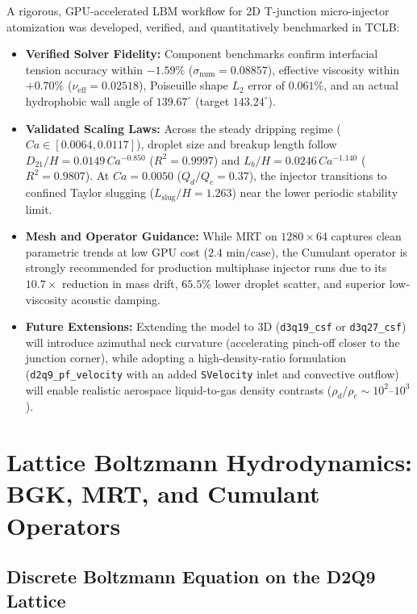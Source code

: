 \documentclass[11pt,a4paper]{article}
\begin{document}
A rigorous, GPU-accelerated LBM workflow for 2D T-junction micro-injector atomization was developed, verified, and quantitatively benchmarked in TCLB:
\begin{itemize}
    \item \textbf{Verified Solver Fidelity:} Component benchmarks confirm interfacial tension accuracy within $-1.59\%$ ($\sigma_{\mathrm{num}} = 0.08857$), effective viscosity within $+0.70\%$ ($\nu_{\mathrm{eff}} = 0.02518$), Poiseuille shape $L_2$ error of $0.061\%$, and an actual hydrophobic wall angle of $139.67^\circ$ (target $143.24^\circ$).
    \item \textbf{Validated Scaling Laws:} Across the steady dripping regime ($Ca \in [0.0064, 0.0117]$), droplet size and breakup length follow $D_{21}/H = 0.0149\,Ca^{-0.850}$ ($R^2 = 0.9997$) and $L_b/H = 0.0246\,Ca^{-1.140}$ ($R^2 = 0.9807$). At $Ca = 0.0050$ ($Q_d/Q_c = 0.37$), the injector transitions to confined Taylor slugging ($L_{\mathrm{slug}}/H = 1.263$) near the lower periodic stability limit.
    \item \textbf{Mesh and Operator Guidance:} While MRT on $1280 \times 64$ captures clean parametric trends at low GPU cost ($2.4\text{ min/case}$), the Cumulant operator is strongly recommended for production multiphase injector runs due to its $10.7\times$ reduction in mass drift, $65.5\%$ lower droplet scatter, and superior low-viscosity acoustic damping.
    \item \textbf{Future Extensions:} Extending the model to 3D (\texttt{d3q19\_csf} or \texttt{d3q27\_csf}) will introduce azimuthal neck curvature (accelerating pinch-off closer to the junction corner), while adopting a high-density-ratio formulation (\texttt{d2q9\_pf\_velocity} with an added \texttt{SVelocity} inlet and convective outflow) will enable realistic aerospace liquid-to-gas density contrasts ($\rho_d/\rho_c \sim 10^2\text{--}10^3$).
\end{itemize}

\clearpage
\appendix
\section{Lattice Boltzmann Hydrodynamics: BGK, MRT, and Cumulant Operators}
\label{app:lbm}

\subsection{Discrete Boltzmann Equation on the D2Q9 Lattice}
\end{document}
